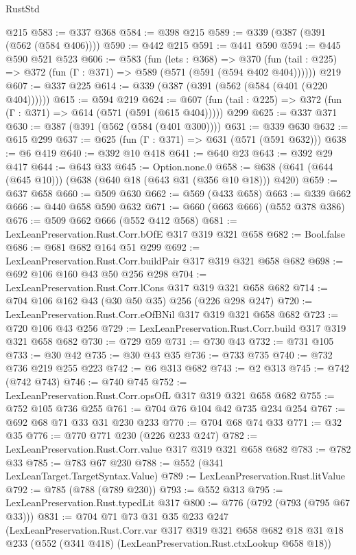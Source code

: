 \begin{lexlean}{RustStd}
\begin{coremodule}
{\begin{coremodule}
{{{{{    @215
@583 := @337 @368
@584 := @398 @215
@589 := @339 (@387 (@391 (@562 (@584 @406))))
@590 := @442 @215
@591 := @441 @590
@594 := @445 @590 @521 @523
@606 := @583
    (fun (lets : @368) =>
    @370 (fun (tail : @225) => @372 (fun (Γ : @371) => @589 (@571 (@591 (@594 @402 @404))))))
    @219
@607 := @337 @225
@614 := @339 (@387 (@391 (@562 (@584 (@401 (@220 @404))))))
@615 := @594 @219
@624 := @607 (fun (tail : @225) => @372 (fun (Γ : @371) => @614 (@571 (@591 (@615 @404))))) @299
@625 := @337 @371
@630 := @387 (@391 (@562 (@584 (@401 @300))))
@631 := @339 @630
@632 := @615 @299
@637 := @625 (fun (Γ : @371) => @631 (@571 (@591 @632)))
@638 := @6 @419
@640 := @392 @10 @418
@641 := @640 @23
@643 := @392 @29 @417
@644 := @643 @33
@645 := Option.none.{0}
@658 := @638 (@641 (@644 (@645 @10))) (@638 (@640 @18 (@643 @31 (@356 @10 @18))) @420)
@659 := @637 @658
@660 := @509 @630
@662 := @569 (@433 @658)
@663 := @339 @662
@666 := @440 @658 @590 @632
@671 := @660 (@663 @666) (@552 @378 @386)
@676 := @509 @662 @666 (@552 @412 @568)
@681 := LexLeanPreservation.Rust.Corr.bOfE @317 @319 @321 @658
@682 := Bool.false
@686 := @681 @682 @164 @51 @299
@692 := LexLeanPreservation.Rust.Corr.buildPair @317 @319 @321 @658 @682
@698 := @692 @106 @160 @43 @50 @256 @298
@704 := LexLeanPreservation.Rust.Corr.lCons @317 @319 @321 @658 @682
@714 := @704 @106 @162 @43 (@30 @50 @35) @256 (@226 @298 @247)
@720 := LexLeanPreservation.Rust.Corr.eOfBNil @317 @319 @321 @658 @682
@723 := @720 @106 @43 @256
@729 := LexLeanPreservation.Rust.Corr.build @317 @319 @321 @658 @682
@730 := @729 @59
@731 := @730 @43
@732 := @731 @105
@733 := @30 @42
@735 := @30 @43 @35
@736 := @733 @735
@740 := @732 @736 @219 @255 @223
@742 := @6 @313 @682
@743 := @2 @313
@745 := @742 (@742 @743)
@746 := @740 @745
@752 := LexLeanPreservation.Rust.Corr.opsOfL @317 @319 @321 @658 @682
@755 := @752 @105 @736 @255
@761 := @704 @76 @104 @42 @735 @234 @254
@767 := @692 @68 @71 @33 @31 @230 @233
@770 := @704 @68 @74 @33
@771 := @32 @35
@776 := @770 @771 @230 (@226 @233 @247)
@782 := LexLeanPreservation.Rust.Corr.value @317 @319 @321 @658 @682
@783 := @782 @33
@785 := @783 @67 @230
@788 := @552 (@341 LexLeanTarget.TargetSyntax.Value)
@789 := LexLeanPreservation.Rust.litValue
@792 := @785 (@788 (@789 @230))
@793 := @552 @313
@795 := LexLeanPreservation.Rust.typedLit @317
@800 := @776 (@792 (@793 (@795 @67 @33)))
@831 := @704
    @71
    @73
    @31
    @35
    @233
    @247
    (LexLeanPreservation.Rust.Corr.var
      @317
      @319
      @321
      @658
      @682
      @18
      @31
      @18
      @233
      (@552 (@341 @418) (LexLeanPreservation.Rust.ctxLookup @658 @18))
}}}}}
\end{coremodule}}
\end{coremodule}
\end{lexlean}
